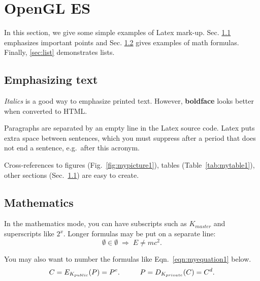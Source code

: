 \documentclass[a4paper,12pt]{article}
\begin{document}

\pagebreak[3]
\section{OpenGL ES}

In this section, we give some simple examples of Latex mark-up. Sec. \ref{sec:emphasis} emphasizes important points and
Sec. \ref{sec:math} gives examples of math formulas. Finally, \ref{sec:list} demonstrates lists.



\subsection{Emphasizing text}\label{sec:emphasis}

\textit{Italics} is a good way to emphasize printed text. However,
\textbf{boldface} looks better when converted to HTML.

Paragraphs are separated by an empty line in the Latex source code.
Latex puts extra space between sentences, which you must suppress
after a period that does not end a sentence, e.g.\ after this acronym.

Cross-references to figures (Fig.~\ref{fig:mypicture1}), tables
(Table~\ref{tab:mytable1}), other sections (Sec.~\ref{sec:emphasis})
are easy to create. 




\subsection{Mathematics}\label{sec:math}

In the mathematics mode, you can have subscripts such as $K_{master}$
and superscripts like $2^x$. Longer formulas may be put on a separate
line:
\[ \emptyset \in \emptyset \; \Rightarrow \; E \neq mc^2. \]

You may also want to number the formulas like Eqn.~\ref{eqn:myequation1}
below.
\begin{equation}\label{eqn:myequation1}
C = E_{K_{public}}(P) = P^e. \hspace{10mm}   P = D_{K_{private}}(C) = C^d.
\end{equation}



\end{document}

